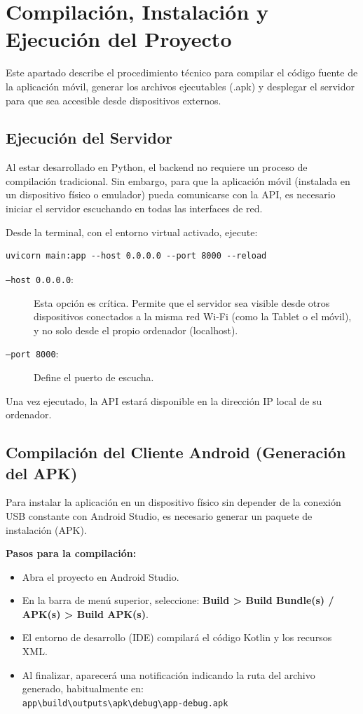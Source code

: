 \section{Compilación, Instalación y Ejecución del Proyecto}
Este apartado describe el procedimiento técnico para compilar el código fuente de la aplicación móvil, generar los archivos ejecutables (.apk) y desplegar el servidor para que sea accesible desde dispositivos externos.

\subsection{Ejecución del Servidor}
Al estar desarrollado en Python, el backend no requiere un proceso de compilación tradicional. Sin embargo, para que la aplicación móvil (instalada en un dispositivo físico o emulador) pueda comunicarse con la API, es necesario iniciar el servidor escuchando en todas las interfaces de red.

Desde la terminal, con el entorno virtual activado, ejecute:
\begin{verbatim}
uvicorn main:app --host 0.0.0.0 --port 8000 --reload
\end{verbatim}

\begin{description}
    \item[\texttt{--host 0.0.0.0}:] Esta opción es crítica. Permite que el servidor sea visible desde otros dispositivos conectados a la misma red Wi-Fi (como la Tablet o el móvil), y no solo desde el propio ordenador (localhost).
    \item[\texttt{--port 8000}:] Define el puerto de escucha.
\end{description}

Una vez ejecutado, la API estará disponible en la dirección IP local de su ordenador.

\subsection{Compilación del Cliente Android (Generación del APK)}
Para instalar la aplicación en un dispositivo físico sin depender de la conexión USB constante con Android Studio, es necesario generar un paquete de instalación (APK).

\textbf{Pasos para la compilación:}
\begin{itemize}
    \item Abra el proyecto en Android Studio.
    \item En la barra de menú superior, seleccione: \textbf{Build > Build Bundle(s) / APK(s) > Build APK(s)}.
    \item El entorno de desarrollo (IDE) compilará el código Kotlin y los recursos XML.
    \item Al finalizar, aparecerá una notificación indicando la ruta del archivo generado, habitualmente en: \\
    \texttt{app\textbackslash build\textbackslash outputs\textbackslash apk\textbackslash debug\textbackslash app-debug.apk}
\end{itemize}

